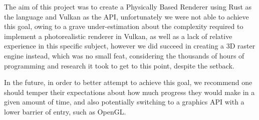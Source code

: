 \documentclass[../report.tex]{subfiles}
\begin{document}
The aim of this project was to create a Physically Based Renderer using Rust as the language and Vulkan as the API, unfortunately we were not able to achieve this goal, owing to a grave under-estimation about the complexity required to implement a photorealistic renderer in Vulkan, as well as a lack of relative experience in this specific subject, however we did succeed in creating a 3D raster engine instead, which was no small feat, considering the thousands of hours of programming and research it took to get to this point, despite the setback.

In the future, in order to better attempt to achieve this goal, we recommend one should temper their expectations about how much progress they would make in a given amount of time, and also potentially switching to a graphics API with a lower barrier of entry, such as OpenGL.
\end{document}
